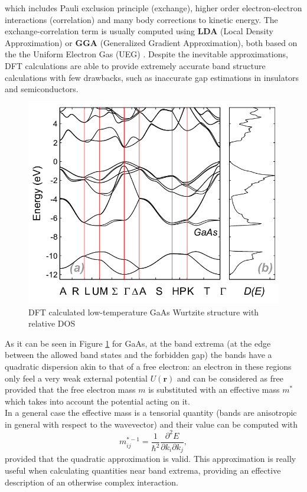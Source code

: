\documentclass[12pt, a4paper]{report}
\numberwithin{equation}{section}
\begin{document}
which includes Pauli exclusion principle (exchange), higher order electron-electron interactions (correlation) and many body corrections to kinetic energy. The exchange-correlation 
term is usually computed using \textbf{LDA} (Local Density Approximation) or \textbf{GGA} (Generalized Gradient Approximation), both based on the the Uniform Electron 
Gas (UEG) \cite{ziesche1998density}.
Despite the inevitable approximations, DFT calculations are able to provide extremely accurate band structure calculations 
with few drawbacks, such as inaccurate gap estimations in insulators and semiconductors.
\begin{figure}[H]
    \centering
    \includegraphics[scale=0.4]{a-Calculated-low-temperature-band-structure-for-GaAs-in-WZ-phase-b-Calculated-DOS.png}
    \caption{DFT calculated low-temperature GaAs Wurtzite structure with relative DOS \cite{GaAs_wurtzite_structure}}
    \label{fig:GaAs_Wurtzite_structure}
\end{figure}
As it can be seen in Figure \ref{fig:GaAs_Wurtzite_structure} for GaAs, at the band extrema (at the edge between the allowed band states 
and the forbidden gap) the bands have a quadratic dispersion akin to that of a free electron: an electron in these regions only feel a 
very weak external potential $U(\mathbf{r})$ and can be considered as free provided that the free electron mass $m$ is substituted with an effective mass 
$m^*$ which takes into account the potential acting on it.\\
In a general case the effective mass is a tensorial quantity (bands are anisotropic in general with respect to the wavevector) and 
their value can be computed with
\begin{equation}
    m^{*-1}_{ij}=\frac{1}{\hbar^2}\frac{\partial^2 E}{\partial k_i \partial k_j},
    \label{eq_effective_mass}
\end{equation}
provided that the quadratic approximation is valid. This approximation is really useful when calculating quantities near band extrema, 
providing an effective description of an otherwise complex interaction.
\end{document}
